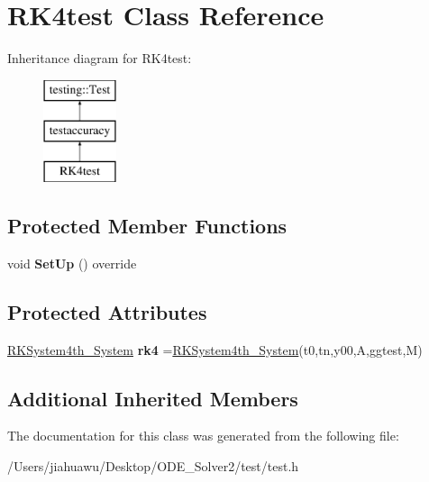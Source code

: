 \hypertarget{class_r_k4test}{}\section{R\+K4test Class Reference}
\label{class_r_k4test}
Inheritance diagram for R\+K4test\+:\begin{figure}[H]
\begin{center}
\leavevmode
\includegraphics[height=3.000000cm]{class_r_k4test}
\end{center}
\end{figure}
\subsection*{Protected Member Functions}
\begin{DoxyCompactItemize}
\item 
\mbox{\label{class_r_k4test_a1a9b748c8134b050e48bb5f455ef272b}} 
void {\bfseries Set\+Up} () override
\end{DoxyCompactItemize}
\subsection*{Protected Attributes}
\begin{DoxyCompactItemize}
\item 
\mbox{\label{class_r_k4test_aa31b776ee582ab28c11f1b16262e536b}} 
\mbox{\hyperlink{class_r_k_system4th___system}{R\+K\+System4th\+\_\+\+System}} {\bfseries rk4} =\mbox{\hyperlink{class_r_k_system4th___system}{R\+K\+System4th\+\_\+\+System}}(t0,tn,y00,A,ggtest,M)
\end{DoxyCompactItemize}
\subsection*{Additional Inherited Members}


The documentation for this class was generated from the following file\+:\begin{DoxyCompactItemize}
\item 
/\+Users/jiahuawu/\+Desktop/\+O\+D\+E\+\_\+\+Solver2/test/test.\+h\end{DoxyCompactItemize}
